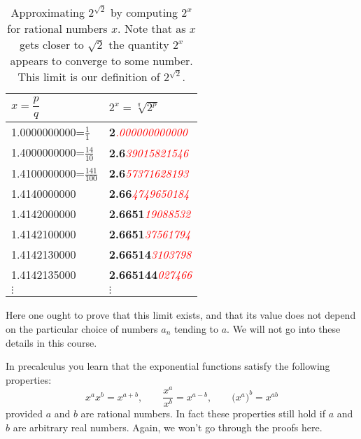\begin{table}[htp]
  \begin{center}
    \begin{tabular}{ll}
      \toprule
      $x=\dfrac pq$  &  $\displaystyle 2^x = \sqrt[q]{2^p}$\\
      \midrule
      1.0000000000=$\frac11$ &
      \textbf{2}\textit{\textcolor{red}{.000000000000}}  \\[2pt]
      1.4000000000=$\frac{14}{10}$ &
      \textbf{2.6}\textit{\textcolor{red}{39015821546}}  \\[2pt]
      1.4100000000=$\frac{141}{100}$  &
      \textbf{2.6}\textit{\textcolor{red}{57371628193}}  \\[2pt]
      1.4140000000 &  \textbf{2.66}\textit{\textcolor{red}{4749650184}}  \\
      1.4142000000 &  \textbf{2.6651}\textit{\textcolor{red}{19088532}}  \\
      1.4142100000 &  \textbf{2.6651}\textit{\textcolor{red}{37561794}}  \\
      1.4142130000 &  \textbf{2.66514}\textit{\textcolor{red}{3103798}}  \\
      1.4142135000 &  \textbf{2.665144}\textit{\textcolor{red}{027466}}  \\
      $\vdots$  &\hspace{24pt} $\vdots$\\
      \bottomrule
    \end{tabular}
  \end{center}\smallskip
  \caption{Approximating $2^{\sqrt{2}}$ by computing $2^x$ for rational
numbers $x$.  Note that as $x$ gets closer to $\sqrt2$ the quantity
$2^x$ appears to converge to some number.  This limit is our
definition of $2^{\sqrt{2}}$.}
  \label{tbl:07twototheroottwo}
\end{table}%








Here one ought to prove that this limit exists, and that its value does not
depend on the particular choice of numbers $a_n$ tending to $a$. We will not go
into these details in this course.




In precalculus you learn that the exponential functions satisfy the
following properties:
\begin{equation}\label{eq:exponential-properties}
  x^a x^b = x^{a+b}, \qquad
  \dfrac{x^a}{x^b} = x^{a-b}, \qquad
  \bigl(x^a\bigr)^b = x^{ab}
\end{equation}
provided $a$ and $b$ are rational numbers. In fact these properties still
hold if $a$ and $b$ are arbitrary real numbers. Again, we
won't go through the proofs here.




